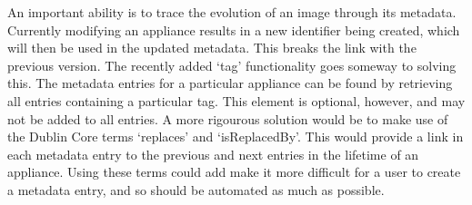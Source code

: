 An important ability is to trace the evolution of an image through its
metadata. Currently modifying an appliance results in a new identifier
being created, which will then be used in the updated metadata. This
breaks the link with the previous version. The recently added `tag'
functionality goes someway to solving this.  The metadata entries for
a particular appliance can be found by retrieving all entries
containing a particular tag. This element is optional, however, and
may not be added to all entries. A more rigourous solution would be to
make use of the Dublin Core terms `replaces' and `isReplacedBy'. This
would provide a link in each metadata entry to the previous and next
entries in the lifetime of an appliance. Using these terms could add make it 
more difficult for a user to create a metadata entry, and so should be 
automated as much as possible.
